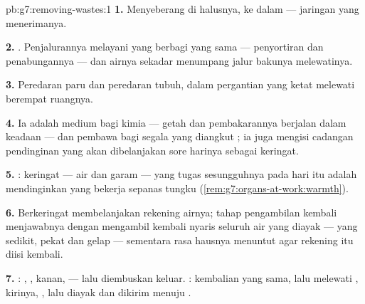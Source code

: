 \begin{solution}{pb:g7:removing-wastes:1}
\textbf{1.} Menyeberang di  halusnya, ke dalam 
--- jaringan  yang menerimanya.

\textbf{2.} . Penjalurannya melayani  yang berbagi
 yang sama --- penyortiran dan penabungannya --- dan airnya
sekadar menumpang jalur bakunya melewatinya.

\textbf{3.} Peredaran paru dan peredaran tubuh, dalam pergantian yang
ketat melewati  berempat ruangnya.

\textbf{4.} Ia adalah medium bagi kimia  --- getah dan
pembakarannya berjalan dalam keadaan  --- dan pembawa bagi
segala yang diangkut ; ia juga mengisi cadangan pendinginan
yang akan dibelanjakan sore harinya sebagai keringat.

\textbf{5.} : keringat --- air dan garam --- yang tugas
sesungguhnya pada hari itu adalah mendinginkan  yang bekerja
sepanas tungku (\cref{rem:g7:organs-at-work:warmth}).

\textbf{6.} Berkeringat membelanjakan rekening airnya; tahap
pengambilan kembali  menjawabnya dengan mengambil kembali
nyaris seluruh air yang diayak ---  yang sedikit, pekat dan
gelap --- sementara rasa hausnya menuntut agar rekening itu diisi
kembali.

\textbf{7.} :  , ,  kanan,
 --- lalu diembuskan keluar. : kembalian yang sama, lalu
melewati ,  kirinya,  , lalu diayak
dan dikirim menuju .


\end{solution}
